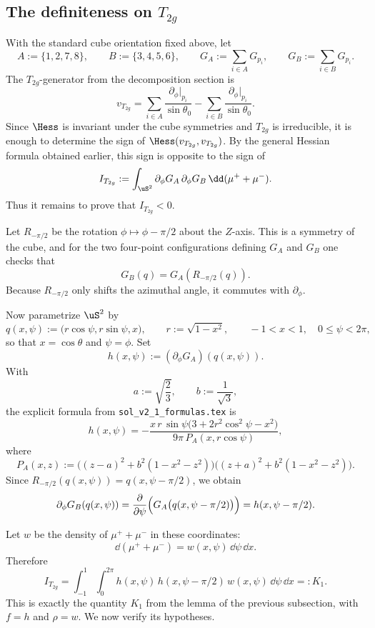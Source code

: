 \subsection{The definiteness on \texorpdfstring{$T_{2g}$}{T2g}}

With the standard cube orientation fixed above, let
\[
A:=\{1,2,7,8\},\qquad B:=\{3,4,5,6\},
\qquad
G_A:=\sum_{i\in A}G_{p_i},\qquad G_B:=\sum_{i\in B}G_{p_i}.
\]
The \(T_{2g}\)-generator from the decomposition section is
\[
v_{T_{2g}}
=
\sum_{i\in A}\frac{\partial_\phi|_{p_i}}{\sin\theta_0}
-
\sum_{i\in B}\frac{\partial_\phi|_{p_i}}{\sin\theta_0}.
\]
Since \(\Hess\) is invariant under the cube symmetries and \(T_{2g}\) is irreducible, it is enough to determine the sign of \(\Hess(v_{T_{2g}},v_{T_{2g}})\). By the general Hessian formula obtained earlier, this sign is opposite to the sign of
\[
I_{T_{2g}}
:=
\int_{\uS^2}\partial_\phi G_A\,\partial_\phi G_B\,\dd(\mu^++\mu^-).
\]
Thus it remains to prove that \(I_{T_{2g}}<0\).

Let \(R_{-\pi/2}\) be the rotation \(\phi\mapsto\phi-\pi/2\) about the \(Z\)-axis. This is a symmetry of the cube, and for the two four-point configurations defining \(G_A\) and \(G_B\) one checks that
\[
G_B(q)=G_A(R_{-\pi/2}(q)).
\]
Because \(R_{-\pi/2}\) only shifts the azimuthal angle, it commutes with \(\partial_\phi\).

Now parametrize \(\uS^2\) by
\[
q(x,\psi):=\bigl(r\cos\psi,r\sin\psi,x\bigr),
\qquad
r:=\sqrt{1-x^2},
\qquad
-1<x<1,\quad 0\leq \psi<2\pi,
\]
so that \(x=\cos\theta\) and \(\psi=\phi\). Set
\[
h(x,\psi):=(\partial_\phi G_A)(q(x,\psi)).
\]
With
\[
a:=\sqrt{\frac23},
\qquad
b:=\frac1{\sqrt3},
\]
the explicit formula from \texttt{sol\_v2\_1\_formulas.tex} is
\[
h(x,\psi)
=
-\frac{x\,r\,\sin\psi\bigl(3+2r^2\cos^2\psi-x^2\bigr)}
{9\pi\,P_A(x,r\cos\psi)},
\]
where
\[
P_A(x,z):=
\bigl((z-a)^2+b^2(1-x^2-z^2)\bigr)
\bigl((z+a)^2+b^2(1-x^2-z^2)\bigr).
\]
Since \(R_{-\pi/2}(q(x,\psi))=q(x,\psi-\pi/2)\), we obtain
\[
\partial_\phi G_B(q(x,\psi))
=
\frac{\partial}{\partial\psi}\Bigl(G_A\bigl(q(x,\psi-\pi/2)\bigr)\Bigr)
=
h(x,\psi-\pi/2).
\]

Let \(w\) be the density of \(\mu^++\mu^-\) in these coordinates:
\[
\dd(\mu^++\mu^-)=w(x,\psi)\,\dd\psi\,\dd x.
\]
Therefore
\[
I_{T_{2g}}
=
\int_{-1}^{1}\int_{0}^{2\pi}
h(x,\psi)\,h(x,\psi-\pi/2)\,w(x,\psi)\,\dd\psi\,\dd x
=:K_1.
\]
This is exactly the quantity \(K_1\) from the lemma of the previous subsection, with \(f=h\) and \(\rho=w\). We now verify its hypotheses.

